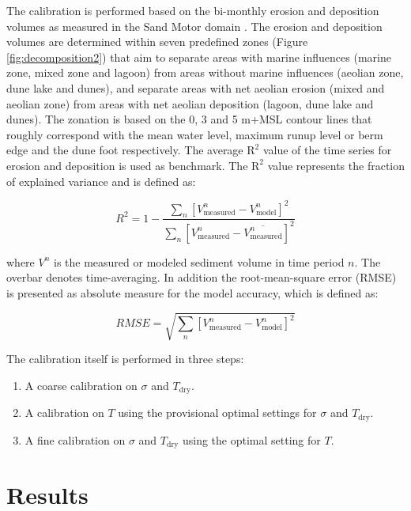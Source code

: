 The calibration is performed based on the bi-monthly erosion and
deposition volumes as measured in the Sand Motor domain
\citep{Hoonhout2017a}. The erosion and deposition volumes are
determined within seven predefined zones (Figure
\ref{fig:decomposition2}) that aim to separate areas with marine
influences (marine zone, mixed zone and lagoon) from areas without
marine influences (aeolian zone, dune lake and dunes), and separate
areas with net aeolian erosion (mixed and aeolian zone) from areas
with net aeolian deposition (lagoon, dune lake and dunes). The zonation
is based on the 0, 3 and 5 m+MSL contour lines that roughly correspond
with the mean water level, maximum runup level or berm edge and the
dune foot respectively. The average $\mathrm{R^2}$ value of the time
series for erosion and deposition is used as benchmark. The
$\mathrm{R^2}$ value represents the fraction of explained variance and
is defined as:

\begin{equation}
  \label{eq:r2}
  R^2 = 1 - \frac{\sum_n \left[ V^n_{\mathrm{measured}} - V^n_{\mathrm{model}} \right]^2}{\sum_n \left[ V^n_{\mathrm{measured}} - \overline{V^n_{\mathrm{measured}}} \right]^2}
\end{equation}

\noindent where $V^n$ is the measured or modeled sediment volume in
time period $n$. The overbar denotes time-averaging. In addition the
root-mean-square error (RMSE) is presented as absolute measure for the
model accuracy, which is defined as:

\begin{equation}
  \label{eq:rmse}
  RMSE = \sqrt{\sum_n \left[ V^n_{\mathrm{measured}} - V^n_{\mathrm{model}} \right]^2}
\end{equation}

\noindent The calibration itself is performed in three steps:

\begin{enumerate}
\item A coarse calibration on $\sigma$ and $T_{\mathrm{dry}}$.
\item A calibration on $T$ using the provisional optimal settings for
  $\sigma$ and $T_{\mathrm{dry}}$.
\item A fine calibration on $\sigma$ and $T_{\mathrm{dry}}$ using the
  optimal setting for $T$.
\end{enumerate}

\section{Results}

